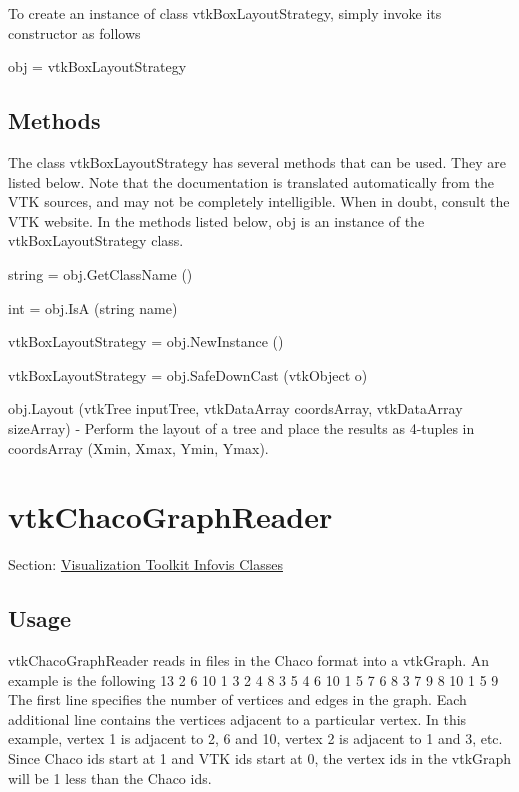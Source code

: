 To create an instance of class vtk\-Box\-Layout\-Strategy, simply invoke its constructor as follows \begin{DoxyVerb}  obj = vtkBoxLayoutStrategy
\end{DoxyVerb}
 \hypertarget{vtkwidgets_vtkxyplotwidget_Methods}{}\subsection{Methods}\label{vtkwidgets_vtkxyplotwidget_Methods}
The class vtk\-Box\-Layout\-Strategy has several methods that can be used. They are listed below. Note that the documentation is translated automatically from the V\-T\-K sources, and may not be completely intelligible. When in doubt, consult the V\-T\-K website. In the methods listed below, {\ttfamily obj} is an instance of the vtk\-Box\-Layout\-Strategy class. 
\begin{DoxyItemize}
\item {\ttfamily string = obj.\-Get\-Class\-Name ()}  
\item {\ttfamily int = obj.\-Is\-A (string name)}  
\item {\ttfamily vtk\-Box\-Layout\-Strategy = obj.\-New\-Instance ()}  
\item {\ttfamily vtk\-Box\-Layout\-Strategy = obj.\-Safe\-Down\-Cast (vtk\-Object o)}  
\item {\ttfamily obj.\-Layout (vtk\-Tree input\-Tree, vtk\-Data\-Array coords\-Array, vtk\-Data\-Array size\-Array)} -\/ Perform the layout of a tree and place the results as 4-\/tuples in coords\-Array (Xmin, Xmax, Ymin, Ymax).  
\end{DoxyItemize}\hypertarget{vtkinfovis_vtkchacographreader}{}\section{vtk\-Chaco\-Graph\-Reader}\label{vtkinfovis_vtkchacographreader}
Section\-: \hyperlink{sec_vtkinfovis}{Visualization Toolkit Infovis Classes} \hypertarget{vtkwidgets_vtkxyplotwidget_Usage}{}\subsection{Usage}\label{vtkwidgets_vtkxyplotwidget_Usage}
vtk\-Chaco\-Graph\-Reader reads in files in the Chaco format into a vtk\-Graph. An example is the following { 13 2 6 10 1 3 2 4 8 3 5 4 6 10 1 5 7 6 8 3 7 9 8 10 1 5 9 } The first line specifies the number of vertices and edges in the graph. Each additional line contains the vertices adjacent to a particular vertex. In this example, vertex 1 is adjacent to 2, 6 and 10, vertex 2 is adjacent to 1 and 3, etc. Since Chaco ids start at 1 and V\-T\-K ids start at 0, the vertex ids in the vtk\-Graph will be 1 less than the Chaco ids.

